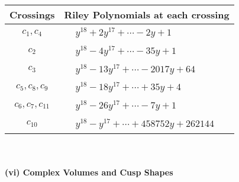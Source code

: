 \documentclass[1p]{elsarticle_modified}
\theoremstyle{definition}
\begin{document}
\begin{tabular}{m{50pt}|m{274pt}}
Crossings & \hspace{64pt}Riley Polynomials at each crossing \\
\hline $$\begin{aligned}c_{1},c_{4}\end{aligned}$$&$\begin{aligned}
&y^{18}+2 y^{17}+\cdots-2 y+1
\end{aligned}$\\
\hline $$\begin{aligned}c_{2}\end{aligned}$$&$\begin{aligned}
&y^{18}-4 y^{17}+\cdots-35 y+1
\end{aligned}$\\
\hline $$\begin{aligned}c_{3}\end{aligned}$$&$\begin{aligned}
&y^{18}-13 y^{17}+\cdots-2017 y+64
\end{aligned}$\\
\hline $$\begin{aligned}c_{5},c_{8},c_{9}\end{aligned}$$&$\begin{aligned}
&y^{18}-18 y^{17}+\cdots+35 y+4
\end{aligned}$\\
\hline $$\begin{aligned}c_{6},c_{7},c_{11}\end{aligned}$$&$\begin{aligned}
&y^{18}-26 y^{17}+\cdots-7 y+1
\end{aligned}$\\
\hline $$\begin{aligned}c_{10}\end{aligned}$$&$\begin{aligned}
&y^{18}- y^{17}+\cdots+458752 y+262144
\end{aligned}$\\
\hline
\end{tabular}\\~\\
\newpage\flushleft \textbf{(vi) Complex Volumes and Cusp Shapes}
\end{document}
